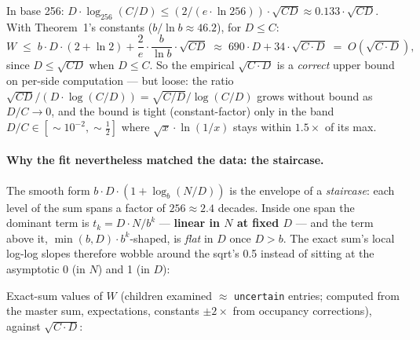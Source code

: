 \documentclass[11pt]{article}
\newcommand{\code}[1]{\texttt{#1}}
\theoremstyle{plain}
\begin{document}
In base 256:
$D \cdot \log_{256}(C/D) \le (2/(e \cdot \ln 256)) \cdot \sqrt{CD}
\approx 0.133 \cdot \sqrt{CD}$. With Theorem~1's constants
($b/\ln b \approx 46.2$), for $D \le C$:
\begin{equation*}
W \;\le\; b \cdot D \cdot (2 + \ln 2)
        + \frac{2}{e} \cdot \frac{b}{\ln b} \cdot \sqrt{CD}
\;\approx\; 690 \cdot D + 34 \cdot \sqrt{C \cdot D}
\;=\; O(\sqrt{C \cdot D}),
\end{equation*}
since $D \le \sqrt{CD}$ when $D \le C$. So the empirical
$\sqrt{C \cdot D}$ is a \emph{correct} upper bound on per-side
computation --- but loose: the ratio
$\sqrt{CD}/(D \cdot \log(C/D)) = \sqrt{C/D}/\log(C/D)$ grows without bound
as $D/C \to 0$, and the bound is tight (constant-factor) only in the band
$D/C \in [{\sim}10^{-2}, {\sim}\tfrac{1}{2}]$ where $\sqrt{x} \cdot \ln(1/x)$
stays within $1.5\times$ of its max.

\paragraph{Why the fit nevertheless matched the data: the staircase.}
The smooth form $b \cdot D \cdot (1 + \log_b(N/D))$ is the envelope of a
\emph{staircase}: each level of the sum spans a factor of $256 \approx 2.4$
decades. Inside one span the dominant term is $t_k = D \cdot N/b^k$ ---
\textbf{linear in $N$ at fixed $D$} --- and the term above it,
$\min(b, D) \cdot b^k$-shaped, is \emph{flat} in $D$ once $D > b$. The
exact sum's local log-log slopes therefore wobble around the sqrt's 0.5
instead of sitting at the asymptotic 0 (in $N$) and 1 (in $D$):

Exact-sum values of $W$ (children examined $\approx$ \code{uncertain}
entries; computed from the master sum, expectations, constants $\pm 2\times$
from occupancy corrections), against $\sqrt{C \cdot D}$:
\end{document}
